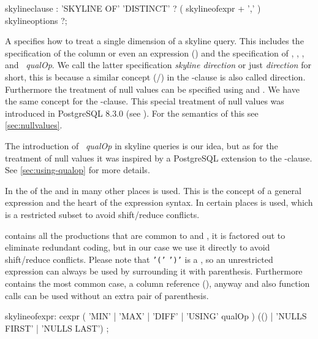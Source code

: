 \begin{rail}
skylineclause : 
    'SKYLINE OF' 'DISTINCT' ? ( skylineofexpr + ',' ) skylineoptions ?;
\end{rail}

A  specifies how to treat a single dimension
of a skyline query. This includes the specification of the column
or even an expression () and the specification of
, , , and 
~\emph{qualOp}. We call the latter specification 
\emph{skyline direction} or just \emph{direction} for short, this
is because a similar concept (/) in the
-clause is also called direction.  Furthermore the
treatment of null values can be specified using  and .  We have the same concept for the
-clause. This special treatment of null values 
was introduced in PostgreSQL 8.3.0 (see
). For
the semantics of this see \autoref{sec:nullvalues}.

The introduction of ~\emph{qualOp} in skyline queries
is our idea, but as for the treatment of null values it was inspired
by a PostgreSQL extension to the -clause. See
\autoref{sec:using-qualop} for more details.

In the  of the  and in many other
places  is used. This is the concept of a general expression
and the heart of the expression syntax. In certain places 
is used, which is a restricted subset to avoid shift/reduce conflicts.

 contains all the productions that are common to 
and , it is factored out to eliminate redundant coding, but
in our case we use it directly to avoid shift/reduce conflicts. Please
note that \texttt{'('}  \texttt{')'} is a , so
an unrestricted expression can always be used by surrounding it with
parenthesis. Furthermore  contains the most common case, a column
reference (), anyway and also function calls can be used
without an extra pair of parenthesis.

\begin{rail}
skylineofexpr:
    cexpr ( 'MIN' | 'MAX' | 'DIFF' | 'USING' qualOp )
    (() | 'NULLS FIRST' | 'NULLS LAST') ;
\end{rail}

